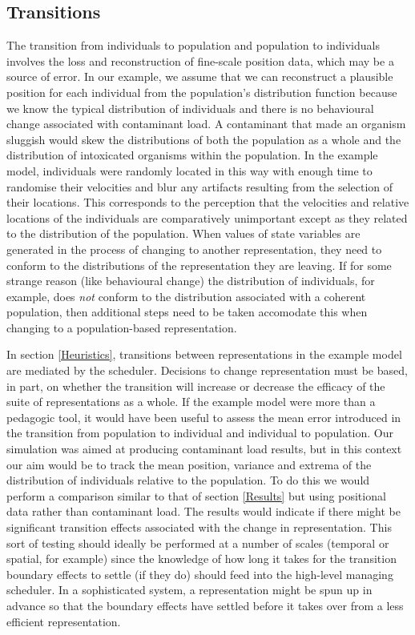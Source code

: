 \subsection{Transitions}

The transition from individuals to population and population to individuals
involves the loss and reconstruction of fine-scale position data, which may be
a source of error. In our example, we assume that we can reconstruct a
plausible position for each individual from the population's distribution
function because we know the typical distribution of individuals and there is
no behavioural change associated with contaminant load. A contaminant that
made an organism sluggish would skew the distributions of both the population
as a whole and the distribution of intoxicated organisms within the
population. In the example model, individuals were randomly located in this
way with enough time to randomise their velocities and blur any artifacts
resulting from the selection of their locations. This corresponds to the
perception that the velocities and relative locations of the individuals are
comparatively unimportant except as they related to the distribution of the
population. When values of state variables are generated in the process of
changing to another representation, they need to conform to the distributions
of the representation they are leaving. If for some strange reason (like
behavioural change) the distribution of individuals, for example, does
{\em{not}} conform to the distribution associated with a coherent
population, then additional steps need to be taken accomodate this when
changing to a population-based representation.

In section \ref{Heuristics}, transitions between representations in the
example model are mediated by the scheduler. Decisions to change
representation must be based, in part, on whether the transition will increase
or decrease the efficacy of the suite of representations as a whole. If the
example model were more than a pedagogic tool, it would have been useful to
assess the mean error introduced in the transition from population to
individual and individual to population. Our simulation was aimed at producing
contaminant load results, but in this context our aim would be to track the
mean position, variance and extrema of the distribution of individuals
relative to the population. To do this we would perform a comparison similar
to that of section \ref{Results} but using positional data rather than
contaminant load. The results would indicate if there might be significant
transition effects associated with the change in representation. This sort of
testing should ideally be performed at a number of scales (temporal or
spatial, for example) since the knowledge of how long it takes for the
transition boundary effects to settle (if they do) should feed into the
high-level managing scheduler. In a sophisticated system, a representation
might be spun up in advance so that the boundary effects have settled before
it takes over from a less efficient representation.

